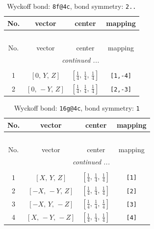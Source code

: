 \documentclass[fleqn,8pt]{jsarticle}
\begin{document}
\begin{longtable}{cccc}
\caption{Wyckoff bond: {\tt 8f@4c}, bond symmetry: {\tt 2..}}
 \\
 \hline \hline
No. & vector & center & mapping \\ \hline \endfirsthead

\multicolumn{3}{l}{\tablename\ \thetable{}} \\
 \hline \hline
No. & vector & center & mapping \\ \hline \endhead

 \hline \hline
\multicolumn{3}{r}{\footnotesize\it continued ...} \\ \endfoot

 \hline \hline
\multicolumn{3}{r}{} \\ \endlastfoot

1 & $\left[ 0,\, Y,\, Z \right]$ & $\left[ \frac{1}{4},\, \frac{1}{4},\, \frac{1}{4} \right]$ & {\tt [1,-4]} \\ \hline
2 & $\left[ 0,\, - Y,\, Z \right]$ & $\left[ \frac{1}{4},\, \frac{1}{4},\, \frac{1}{4} \right]$ & {\tt [2,-3]} \\
\end{longtable}
\renewcommand{\arraystretch}{1.2}
\begin{longtable}{cccc}
\caption{Wyckoff bond: {\tt 16g@4c}, bond symmetry: {\tt 1}}
 \\
 \hline \hline
No. & vector & center & mapping \\ \hline \endfirsthead

\multicolumn{3}{l}{\tablename\ \thetable{}} \\
 \hline \hline
No. & vector & center & mapping \\ \hline \endhead

 \hline \hline
\multicolumn{3}{r}{\footnotesize\it continued ...} \\ \endfoot

 \hline \hline
\multicolumn{3}{r}{} \\ \endlastfoot

1 & $\left[ X,\, Y,\, Z \right]$ & $\left[ \frac{1}{4},\, \frac{1}{4},\, \frac{1}{4} \right]$ & {\tt [1]} \\ \hline
2 & $\left[ - X,\, - Y,\, Z \right]$ & $\left[ \frac{1}{4},\, \frac{1}{4},\, \frac{1}{4} \right]$ & {\tt [2]} \\ \hline
3 & $\left[ - X,\, Y,\, - Z \right]$ & $\left[ \frac{1}{4},\, \frac{1}{4},\, \frac{1}{4} \right]$ & {\tt [3]} \\ \hline
4 & $\left[ X,\, - Y,\, - Z \right]$ & $\left[ \frac{1}{4},\, \frac{1}{4},\, \frac{1}{4} \right]$ & {\tt [4]} \\
\end{longtable}
\end{document}
